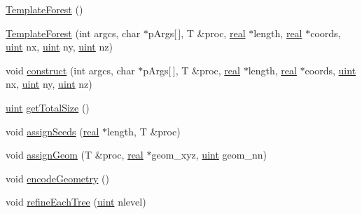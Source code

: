 \begin{DoxyCompactItemize}
\item 
\mbox{\hyperlink{classTemplateForest_a48ebaf92fb390fd229a2438f99145881}{Template\+Forest}} ()
\item 
\mbox{\hyperlink{classTemplateForest_ab842720aca5e202357e399ba835565b7}{Template\+Forest}} (int argcs, char $\ast$p\+Args\mbox{[}$\,$\mbox{]}, T \&proc, \mbox{\hyperlink{definitions_8h_aedc0ad84d1e764530814f57ad931d02a}{real}} $\ast$length, \mbox{\hyperlink{definitions_8h_aedc0ad84d1e764530814f57ad931d02a}{real}} $\ast$coords, \mbox{\hyperlink{definitions_8h_a69aa29b598b851b0640aa225a9e5d61d}{uint}} nx, \mbox{\hyperlink{definitions_8h_a69aa29b598b851b0640aa225a9e5d61d}{uint}} ny, \mbox{\hyperlink{definitions_8h_a69aa29b598b851b0640aa225a9e5d61d}{uint}} nz)
\item 
void \mbox{\hyperlink{classTemplateForest_a6173898510ccf3f57a6b930a31f971dd}{construct}} (int argcs, char $\ast$p\+Args\mbox{[}$\,$\mbox{]}, T \&proc, \mbox{\hyperlink{definitions_8h_aedc0ad84d1e764530814f57ad931d02a}{real}} $\ast$length, \mbox{\hyperlink{definitions_8h_aedc0ad84d1e764530814f57ad931d02a}{real}} $\ast$coords, \mbox{\hyperlink{definitions_8h_a69aa29b598b851b0640aa225a9e5d61d}{uint}} nx, \mbox{\hyperlink{definitions_8h_a69aa29b598b851b0640aa225a9e5d61d}{uint}} ny, \mbox{\hyperlink{definitions_8h_a69aa29b598b851b0640aa225a9e5d61d}{uint}} nz)
\item 
\mbox{\hyperlink{definitions_8h_a69aa29b598b851b0640aa225a9e5d61d}{uint}} \mbox{\hyperlink{classTemplateForest_a43dbd821af1ed816be9ef782b6982c24}{get\+Total\+Size}} ()
\item 
void \mbox{\hyperlink{classTemplateForest_ae2a665238333df093bece9ec5b40d1f1}{assign\+Seeds}} (\mbox{\hyperlink{definitions_8h_aedc0ad84d1e764530814f57ad931d02a}{real}} $\ast$length, T \&proc)
\item 
void \mbox{\hyperlink{classTemplateForest_a81eba445f5dd75c651ec4477128e38ba}{assign\+Geom}} (T \&proc, \mbox{\hyperlink{definitions_8h_aedc0ad84d1e764530814f57ad931d02a}{real}} $\ast$geom\+\_\+xyz, \mbox{\hyperlink{definitions_8h_a69aa29b598b851b0640aa225a9e5d61d}{uint}} geom\+\_\+nn)
\item 
void \mbox{\hyperlink{classTemplateForest_a918118ff88c9f738de633c0e83a8b69b}{encode\+Geometry}} ()
\item 
void \mbox{\hyperlink{classTemplateForest_a011af6d1e352dfb90e3e74daa2d34e36}{refine\+Each\+Tree}} (\mbox{\hyperlink{definitions_8h_a69aa29b598b851b0640aa225a9e5d61d}{uint}} nlevel)
\item 

\end{DoxyCompactItemize}
